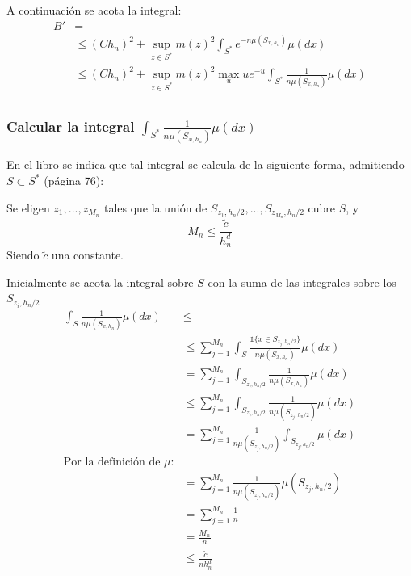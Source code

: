 \documentclass[12pt, a4paper]{article}
\begin{document}
A continuación se acota la integral:
$$
\begin{aligned}
B' &= \\
&\leq(C h_n)^2 + \mathop{sup}_{z \in S^{*}} m(z)^2 \int_{S^{*}} e^{-n\mu(S_{x,h_n})} \mu(dx) \\
&\leq(C h_n)^2 + \mathop{sup}_{z \in S^{*}} m(z)^2 \mathop{max}_u ue^{-u} \int_{S^{*}} \frac{1}{n\mu(S_{x,h_n})} \mu(dx) \\
\end{aligned}
$$

\subsubsection{Calcular la integral $\int_{S^{*}} \frac{1}{n\mu(S_{x,h_n})} \mu(dx) $}
En el libro se indica que tal integral se calcula de la siguiente forma, admitiendo $S\subset S^{*}$ (página 76):

Se eligen $z_1, ..., z_{M_n}$ tales que la unión de $S_{z_1, h_n/2}, ..., S_{z_{M_n}, h_n/2}$ cubre $S$, y $$ M_n \leq \frac{\tilde{c}}{h_n^d} $$
Siendo $\tilde{c}$ una constante.

Inicialmente se acota la integral sobre $S$ con la suma de las integrales sobre los $S_{z_i,h_n/2}$
$$
\begin{aligned}
\int_{S} \frac{1}{n\mu(S_{x,h_n})} \mu(dx)  &\leq \\
&\leq \sum_{j=1}^{M_n} \int_{S} \frac{\mathds{1}\{ x\in S_{z_j,h_n/2} \}}{n\mu(S_{x,h_n})} \mu(dx) \\
&= \sum_{j=1}^{M_n} \int_{S_{z_j,h_n/2}} \frac{1}{n\mu(S_{x,h_n})} \mu(dx) \\
&\leq \sum_{j=1}^{M_n} \int_{S_{z_j,h_n/2}} \frac{1}{n\mu(S_{z_j,h_n/2})} \mu(dx) \\
&= \sum_{j=1}^{M_n} \frac{1}{n\mu(S_{z_j,h_n/2})} \int_{S_{z_j,h_n/2}}  \mu(dx) \\
\text{Por la definición de $\mu$:} \\
&= \sum_{j=1}^{M_n} \frac{1}{n\mu(S_{z_j,h_n/2})}  \mu(S_{z_j,h_n/2}) \\
&= \sum_{j=1}^{M_n} \frac{1}{n} \\
&= \frac{M_n}{n} \\
&\leq \frac{\tilde{c}}{nh_n^d} \\
\end{aligned}
$$
\end{document}
